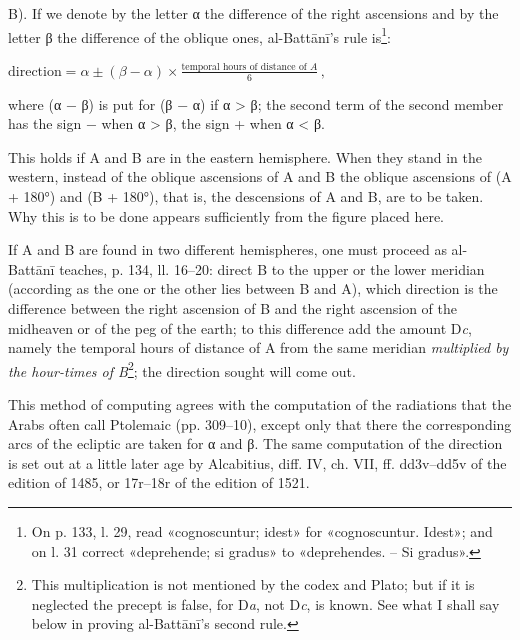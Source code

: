 \documentclass[11pt]{article}
\newcommand{\Pg}[1]{\marginpar{\footnotesize\color{gray}#1}}
\begin{document}
 B). \] If we denote by the letter {\greekfont α} the difference of the right ascensions and by the letter {\greekfont β} the difference of the oblique ones, al-Battānī's rule is\footnote{On p. 133, l. 29, read «cognoscuntur; idest» for «cognoscuntur. Idest»; and on l. 31 correct «deprehende; si gradus» to «deprehendes. – Si gradus».}: \par\noindent\hspace*{1.5em}$\displaystyle \text{direction} = \alpha \pm (\beta - \alpha)\times\frac{\text{temporal hours of distance of } A}{6}\,,$\par where ({\greekfont α} − {\greekfont β}) is put for ({\greekfont β} − {\greekfont α}) if {\greekfont α} > {\greekfont β}; the second term of the second member has the sign − when {\greekfont α} > {\greekfont β}, the sign + when {\greekfont α} < {\greekfont β}.\par
\begin{center}\end{center}
\par This holds if A and B are in the eastern hemisphere. When they stand in the western, instead of the oblique ascensions of A and B the oblique ascensions of (A + 180°) and (B + 180°), that is, the descensions of A and B, are to be taken. Why this is to be done appears sufficiently from the figure placed here.\par
\par If A and B are found in two different hemispheres, one must proceed as al-Battānī teaches, p. 134, ll. 16–20: direct B to the upper or the lower meridian (according as the one or the other lies between B and A), which direction is the difference between the right ascension of B and the right ascension of the midheaven or of the peg of the earth; to this difference add the amount D\emph{c}, namely the temporal hours of distance of A from the same meridian \emph{multiplied by the hour-times of B}\footnote{This multiplication is not mentioned by the codex and Plato; but if it is neglected the precept is false, for D\emph{a}, not D\emph{c}, is known. See what I shall say below in proving al-Battānī's second rule.}; the direction sought will come out.\par
\par \Pg{I 317}This method of computing agrees with the computation of the radiations that the Arabs often call Ptolemaic (pp. 309–10), except only that there the corresponding arcs of the ecliptic are taken for {\greekfont α} and {\greekfont β}. The same computation of the direction is set out at a little later age by Alcabitius, diff. IV, ch. VII, ff. dd3v–dd5v of the edition of 1485, or 17r–18r of the edition of 1521.\par
\end{document}
